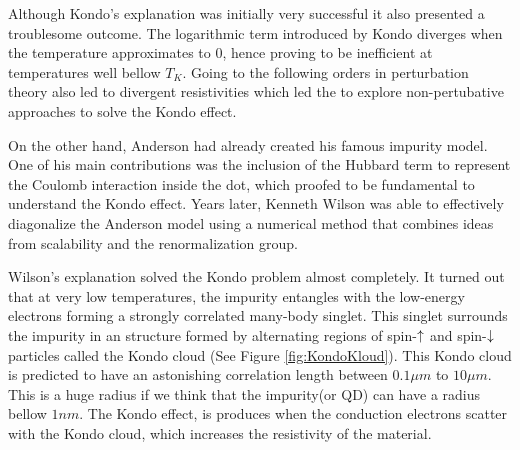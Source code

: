 Although Kondo's explanation was initially very successful it also presented a troublesome outcome. The logarithmic term introduced by Kondo diverges when the temperature approximates to $0$, hence proving to be inefficient at temperatures well bellow $T_K$. Going to the following orders in perturbation theory also led to divergent resistivities which led the to explore non-pertubative approaches to solve the Kondo effect. 

On the other hand, Anderson had already created his famous impurity model. One of his main contributions was the inclusion of the Hubbard term to represent the Coulomb interaction inside the dot, which proofed to be fundamental to understand the Kondo effect. Years later, Kenneth Wilson was able to effectively diagonalize the Anderson model using a numerical method that combines ideas from scalability and the renormalization group. 

Wilson's explanation solved the Kondo problem almost completely. It turned out that at very low temperatures, the impurity entangles with the low-energy electrons forming a strongly correlated many-body singlet. This singlet surrounds the impurity in an structure formed by alternating regions of spin-$\uparrow$ and spin-$\downarrow$ particles called the Kondo cloud (See Figure \ref{fig:KondoKloud}). This Kondo cloud is predicted to have an astonishing correlation length between $0.1\mu m$ to $10 \mu m$. This is a huge radius if we think that the impurity(or QD) can have a radius bellow $1nm$. The Kondo effect, is produces when the conduction electrons scatter with the Kondo cloud, which increases the resistivity of the material. 












